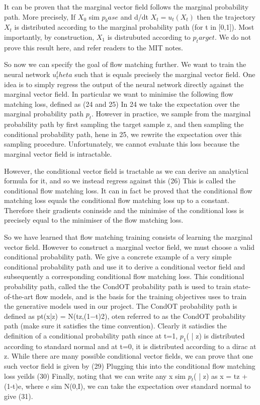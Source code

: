 \documentclass[12pt,a4paper]{report}
\begin{document}
It can be proven that the marginal vector field follows the marginal probability path. More precisely, 
If $X_0$ sim $p_base$ and d/dt $X_t = u_t(X_t)$ then the trajectory $X_t$ is distributed according to the marginal probability path (for t in [0,1]). 
Most importantly, by construction, $X_1$ is distrubuted according to $p_target$. 
We do not prove this result here, and refer readers to the MIT notes. 

So now we can specify the goal of flow matching further. We want to train the neural network $u_t^theta$ such that is equals precisely the marginal vector field. 
One idea is to simply regress the output of the neural network directly against the marginal vector field. In particular we want to minimise the following flow matching loss, defined as 
(24 and 25)
In 24 we take the expectation over the marginal probability path $p_t$. However in practice, we sample from the marginal probability path by first sampling the target sample z, and then sampling the conditional probability path, hene in 25, we rewrite the expectation over this sampling procedure. 
Unfortunately, we cannot evaluate this loss because the marginal vector field is intractable. 

However, the conditional vector field is tractable as we can derive an analytical formula for it, and so we instead regress against this
(26)
This is called the conditional flow matching loss. It can in fact be proved that the conditional flow matching loss equals the conditional flow matching loss up to a constant. 
Therefore their gradients coninside and the minimise of the conditional loss is precisely equal to the minimiser of the flow matching loss. 

So we have learned that flow matching training consists of learning the marginal vector field. However to construct a marginal vector field, we must choose a valid conditional probability path. 
We give a concrete example of a very simple conditional probability path and use it to derive a conditional vector field and subsequently a corresponding conditional flow matching loss. 
This conditional probability path, called the the CondOT probability path is used to train state-of-the-art flow models, and is the basis for the training objectives uses to train the generative models used in our project. 
The CondOT probability path is defined as pt(x|z) = N(tz,(1−t)2), oten referred to as the CondOT probability path (make sure it satisfies the time convention). 
Clearly it satisdies the definition of a conditional probability path since at t=1, $p_1$( | z) is distributed according to standard normal and at t=0, it is distributed according to a dirac at z. 
While there are many possible conditional vector fields, we can prove that one such vector field is given by 
(29)
Plugging this into the conditional flow matching loss yeilds
(30)
Finally, noting that we can write any x sim $p_t$( | z) as x = tz + (1-t)e, where e sim N(0,I), we can take the expectation over standard normal to give (31). 
\end{document}

